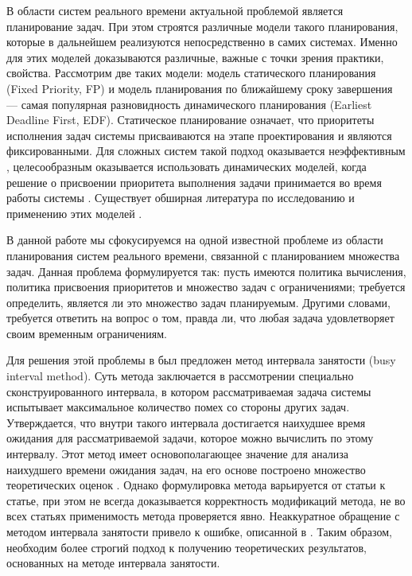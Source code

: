 \documentclass[14pt]{matmex-diploma-custom}
\begin{document}
В области систем реального времени актуальной проблемой является планирование 
  задач. При этом строятся различные модели такого планирования, которые в дальнейшем 
  реализуются непосредственно в самих системах. Именно для этих моделей доказываются 
  различные, важные с точки зрения практики, свойства.
  Рассмотрим две таких модели: модель статического планирования (Fixed Priority, FP) 
  и модель планирования по ближайшему сроку завершения --- самая популярная разновидность
  динамического планирования (Earliest Deadline First, EDF). Статическое планирование 
  означает, что приоритеты исполнения задач системы присваиваются на этапе 
  проектирования и являются фиксированными. Для сложных систем такой подход оказывается 
  неэффективным \cite{Liu1973SchedulingAF}, целесообразным оказывается использовать 
  динамических моделей, когда решение о присвоении приоритета выполнения задачи 
  принимается во время работы системы \cite{Baruah2003DynamicAS, Becker2001ExecutionEF, Spuri1996SchedulingAT}. 
  Существует обширная литература по исследованию и применению этих моделей 
  \cite{Campoy2004SchedulabilityAI, Kwok1999StaticSA, Sakellariou2007SchedulingWW, Wang1999SchedulingFT}. 

В данной работе мы сфокусируемся на одной известной проблеме из области планирования 
  систем реального времени, связанной с планированием множества задач. Данная
  проблема формулируется так: пусть имеются политика вычисления, политика присвоения 
  приоритетов и множество задач с ограничениями; требуется определить, является ли 
  это множество задач планируемым. Другими словами, требуется ответить 
  на вопрос о том, правда ли, что любая задача удовлетворяет своим временным ограничениям. 
  
Для решения этой проблемы в \cite{Lehoczky1990FixedPS} был предложен метод интервала 
  занятости (busy interval method). Суть метода заключается в рассмотрении специально 
  сконструированного интервала, в котором рассматриваемая задача системы  испытывает максимальное количество 
  помех со стороны других задач. Утверждается, что внутри такого интервала достигается
  наихудшее время ожидания для рассматриваемой задачи, которое можно вычислить по этому интервалу.
  Этот метод имеет основополагающее 
  значение для анализа наихудшего времени ожидания задач, на его основе построено 
  множество теоретических оценок \cite{Bertogna2005ImprovedSA, Guo2015EDFSA, Lehoczky1990FixedPS, 
  Zhang2009SchedulabilityAF}. Однако формулировка метода варьируется от статьи к 
  статье, при этом не всегда доказывается корректность модификаций 
  метода, не во всех статьях применимость метода проверяется явно. Неаккуратное 
  обращение с методом интервала занятости привело к ошибке, описанной в 
  \cite{Bril06messageresponse}. Таким образом, необходим более строгий подход к
  получению теоретических результатов, основанных на методе интервала занятости.
\end{document}
